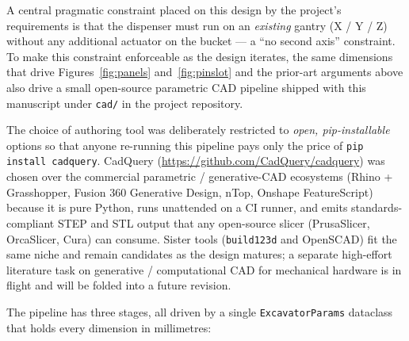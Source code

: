 \documentclass[11pt,a4paper]{article}
\begin{document}
A central pragmatic constraint placed on this design by the project's
requirements is that the dispenser must run on an \emph{existing} gantry
(X / Y / Z) without any additional actuator on the bucket --- a ``no second
axis'' constraint. To make this constraint enforceable as the design
iterates, the same dimensions that drive Figures~\ref{fig:panels} and~\ref{fig:pinslot} and
the prior-art arguments above also drive a small open-source parametric
CAD pipeline shipped with this manuscript under \texttt{cad/} in the
project repository.

The choice of authoring tool was deliberately restricted to \emph{open,
pip-installable} options so that anyone re-running this pipeline pays only
the price of \texttt{pip install cadquery}. CadQuery
(\url{https://github.com/CadQuery/cadquery}) was chosen over the
commercial parametric / generative-CAD ecosystems (Rhino + Grasshopper,
Fusion 360 Generative Design, nTop, Onshape FeatureScript) because it is
pure Python, runs unattended on a CI runner, and emits standards-compliant
STEP and STL output that any open-source slicer (PrusaSlicer, OrcaSlicer,
Cura) can consume. Sister tools (\texttt{build123d} and OpenSCAD) fit the
same niche and remain candidates as the design matures; a separate
high-effort literature task on generative / computational CAD for
mechanical hardware is in flight and will be folded into a future revision.

The pipeline has three stages, all driven by a single
\texttt{ExcavatorParams} dataclass that holds every dimension in
millimetres:
\end{document}
